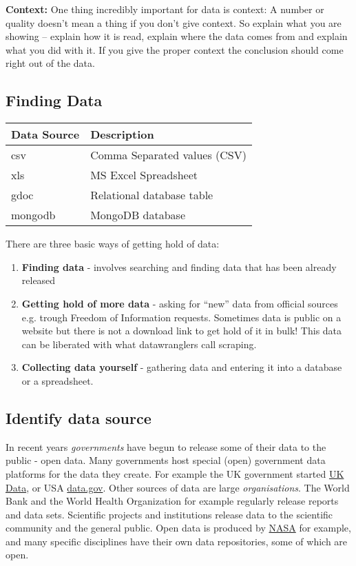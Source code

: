 \documentclass[letterpaper,10pt,oneside]{sphinxmanual}
\begin{document}
\textbf{Context:} One thing incredibly important for data is context: A number or quality doesn’t mean a thing if you don’t give context.
So explain what you are showing – explain how it is read, explain where the data comes from and explain what you did with it.
If you give the proper context the conclusion should come right out of the data.


\subsection{\textbf{Finding Data}}
\label{introduction:finding-data}
\begin{tabulary}{\linewidth}{|L|L|}
\hline
\textsf{\relax 
\textbf{Data Source}
} & \textsf{\relax 
\textbf{Description}
}\\
\hline
csv
 & 
Comma Separated values (CSV)
\\
\hline
xls
 & 
MS Excel Spreadsheet
\\
\hline
gdoc
 & 
Relational database table
\\
\hline
mongodb
 & 
MongoDB database
\\
\hline\end{tabulary}


There are three basic ways of getting hold of data:
\begin{enumerate}
\item {} 
\textbf{Finding data} - involves searching and finding data that has been already released

\item {} 
\textbf{Getting hold of more data} - asking for “new” data from official sources e.g. trough
Freedom of Information requests. Sometimes data is public on a website but there is not
a download link to get hold of it in bulk! This data can be liberated with what
datawranglers call scraping.

\item {} 
\textbf{Collecting data yourself} - gathering data and entering it into a database or a
spreadsheet.

\end{enumerate}


\subsection{Identify data source}
\label{introduction:identify-data-source}
In recent years \emph{governments} have begun to release some of their data to the public - open data.
Many governments host special (open) government data platforms for the data they create.
For example the UK government started \href{https://www.ukdataservice.ac.uk}{UK Data}, or USA \href{http://www.data.gov}{data.gov}.
Other sources of data are large \emph{organisations}.
The World Bank and the World Health Organization for example regularly release reports and data sets.
Scientific projects and institutions release data to the scientific community and the general public.
Open data is produced by \href{https://www.nasa.gov}{NASA} for example, and many specific disciplines have their own data repositories, some of which are open.
\end{document}
